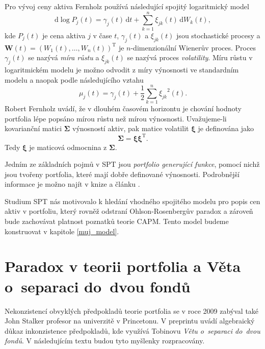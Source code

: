 \documentclass[a4paper,12pt]{report}
\theoremstyle{definition} \newtheorem{definice}[veta]{Definice}
\theoremstyle{remark}
\begin{document}
Pro vývoj ceny aktiva Fernholz používá následující spojitý logaritmický model
$$\mathrm{d}\log P_j(t)=\gamma_j(t)\,\mathrm{d}t+\sum_{k=1}^{n}\xi_{jk}(t)\,\mathrm{d}W_k(t),$$
kde $P_j(t)$ je cena aktiva $j$ v čase $t$, $\gamma_j(t)$ a $\xi_{jk}(t)$ jsou stochastické procesy a $\boldsymbol{W}(t)=(W_1(t),\dots,W_n(t))^\mathrm{T}$ je $n$-dimenzionální Wienerův proces. 
Proces $\gamma_j(t)$ se nazývá \textit{míra růstu} a $\xi_{jk}(t)$ se nazývá proces \textit{volatility}.
Míru růstu v logaritmickém modelu je možno odvodit z míry výnosnosti ve standardním modelu a naopak podle následujícího vztahu
$$\mu_j(t)=\gamma_j(t)+\frac12\sum_{k=1}^{n}{\xi_{jk}}^2(t).$$
Robert Fernholz uvádí, že v dlouhém časovém horizontu je chování hodnoty portfolia lépe popsáno mírou růstu než mírou výnosnosti.
Uvažujeme-li kovarianční matici $\boldsymbol{\Sigma}$ výnosností aktiv, pak matice volatilit $\boldsymbol{\xi}$ je definována jako
$$\boldsymbol{\Sigma}=\boldsymbol{\xi}\boldsymbol{\xi}^\mathrm{T}.$$
Tedy $\boldsymbol{\xi}$ je maticová odmocnina z $\boldsymbol{\Sigma}$.

Jedním ze základních pojmů v SPT jsou \textit{portfolio generující funkce}, pomocí nichž jsou tvořeny portfolia, které mají dobře definované výnosnosti. 
Podrobnější informace je možno najít v knize \cite{fern} a článku \cite{kara}.

Studium SPT nás motivovalo k hledání vhodného spojitého modelu pro popis cen aktiv v portfoliu, který rovněž odstraní Ohlson-Rosenbergův paradox a zároveň bude zachovávat platnost poznatků teorie CAPM.
Tento model budeme konstruovat v kapitole \ref{muj_model}.




\section{Paradox v teorii portfolia a Věta o~separaci do~dvou fondů} \label{john}
Nekonzistencí obvyklých předpokladů teorie portfolia se v roce 2009 zabýval také John Stalker profesor na univerzitě v Princetonu. 
V preprintu \cite{john} uvádí algebraický důkaz inkonzistence předpokladů, kde využívá Tobinovu \textit{Větu o~separaci do~dvou fondů}. 
V následujícím textu budou tyto myšlenky rozpracovány.
\end{document}
